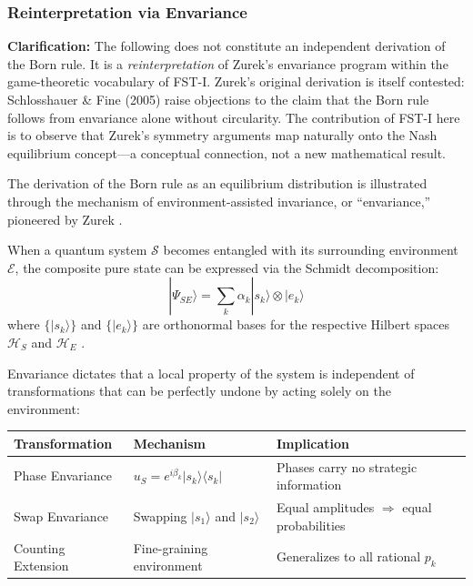 \documentclass[12pt,a4paper]{article}
\theoremstyle{remark}
\begin{document}
\subsubsection{Reinterpretation via Envariance}

\textbf{Clarification:} The following does not constitute an independent derivation of the Born rule. It is a \emph{reinterpretation} of Zurek's envariance program \citep{Zurek2003,Zurek2005} within the game-theoretic vocabulary of FST-I. Zurek's original derivation is itself contested: Schlosshauer \& Fine (2005) \citep{SchlossFine2005} raise objections to the claim that the Born rule follows from envariance alone without circularity. The contribution of FST-I here is to observe that Zurek's symmetry arguments map naturally onto the Nash equilibrium concept---a conceptual connection, not a new mathematical result.

The derivation of the Born rule as an equilibrium distribution is illustrated through the mechanism of environment-assisted invariance, or ``envariance,'' pioneered by Zurek \citep{Zurek2003,Zurek2005}.

When a quantum system $\mathcal{S}$ becomes entangled with its surrounding environment $\mathcal{E}$, the composite pure state can be expressed via the Schmidt decomposition:
\begin{equation}
|\Psi_{SE}\rangle = \sum_k \alpha_k |s_k\rangle \otimes |e_k\rangle
\end{equation}
where $\{|s_k\rangle\}$ and $\{|e_k\rangle\}$ are orthonormal bases for the respective Hilbert spaces $\mathcal{H}_S$ and $\mathcal{H}_E$ \citep{SchlossFine2005}.

Envariance dictates that a local property of the system is independent of transformations that can be perfectly undone by acting solely on the environment:

\begin{center}
\begin{tabular}{lll}
\toprule
\textbf{Transformation} & \textbf{Mechanism} & \textbf{Implication} \\
\midrule
Phase Envariance & $u_S = e^{i\beta_k}|s_k\rangle\langle s_k|$ & Phases carry no strategic information \\
Swap Envariance & Swapping $|s_1\rangle$ and $|s_2\rangle$ & Equal amplitudes $\Rightarrow$ equal probabilities \\
Counting Extension & Fine-graining environment & Generalizes to all rational $p_k$ \\
\bottomrule
\end{tabular}
\end{center}
\end{document}
